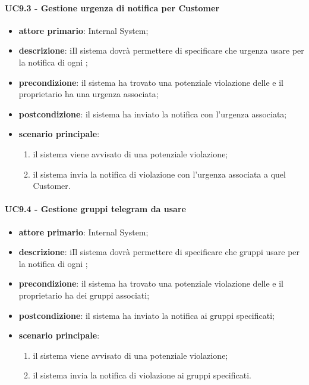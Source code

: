 \paragraph{UC9.3 -  Gestione urgenza di notifica per Customer}
\begin{itemize}
	\item \textbf{attore primario}: Internal System;
	\item \textbf{descrizione}: iIl sistema dovrà permettere di specificare che urgenza usare per la notifica di ogni ; 
	\item \textbf{precondizione}: il sistema ha trovato una potenziale violazione delle  e il  proprietario ha una urgenza associata;
	\item \textbf{postcondizione}: il sistema ha inviato la notifica con l'urgenza associata;
	\item \textbf{scenario principale}: 
	\begin{enumerate}
		\item il sistema viene avvisato di una potenziale violazione;
		\item il sistema invia la notifica di violazione con l'urgenza associata a quel Customer.
	\end{enumerate}
\end{itemize}
\paragraph{UC9.4 -  Gestione gruppi telegram da usare}
\begin{itemize}
	\item \textbf{attore primario}: Internal System;
	\item \textbf{descrizione}: iIl sistema dovrà permettere di specificare che gruppi  usare per la notifica di ogni ; 
	\item \textbf{precondizione}: il sistema ha trovato una potenziale violazione delle  e il  proprietario ha dei gruppi  associati;
	\item \textbf{postcondizione}: il sistema ha inviato la notifica ai gruppi specificati;
	\item \textbf{scenario principale}: 
	\begin{enumerate}
		\item il sistema viene avvisato di una potenziale violazione;
		\item il sistema invia la notifica di violazione ai gruppi specificati.
	\end{enumerate}
\end{itemize}
